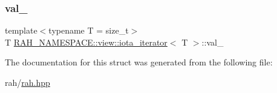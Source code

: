 \subsubsection{\texorpdfstring{val\_}{val\_}}
{\footnotesize\ttfamily template$<$typename T  = size\+\_\+t$>$ \\
T \mbox{\hyperlink{struct_r_a_h___n_a_m_e_s_p_a_c_e_1_1view_1_1iota__iterator}{R\+A\+H\+\_\+\+N\+A\+M\+E\+S\+P\+A\+C\+E\+::view\+::iota\+\_\+iterator}}$<$ T $>$\+::val\+\_\+}



The documentation for this struct was generated from the following file\+:\begin{DoxyCompactItemize}
\item 
rah/\mbox{\hyperlink{rah_8hpp}{rah.\+hpp}}\end{DoxyCompactItemize}
